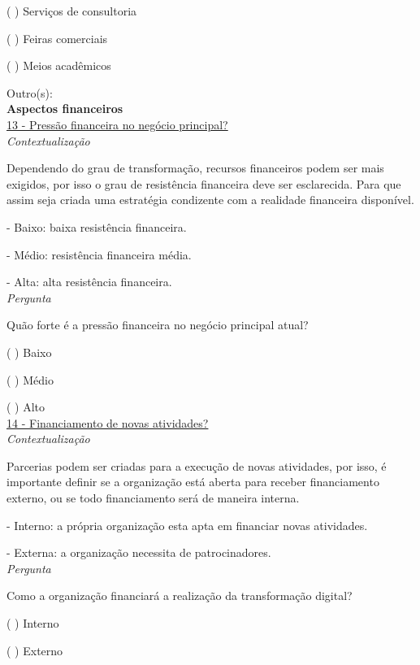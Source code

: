 ( ) Serviços de consultoria

( ) Feiras comerciais

( ) Meios acadêmicos

Outro(s):\\


\textbf{Aspectos financeiros}\\

\underline{13 - Pressão financeira no negócio principal?}\\

\textit{Contextualização}

Dependendo do grau de transformação, recursos financeiros podem ser mais exigidos, por isso o grau de resistência financeira deve ser esclarecida. Para que assim seja criada uma estratégia condizente com a realidade financeira disponível.

- Baixo: baixa resistência financeira.

- Médio: resistência financeira média.

- Alta: alta resistência financeira.\\


\textit{Pergunta}

Quão forte é a pressão financeira no negócio principal atual?

( ) Baixo

( ) Médio

( ) Alto\\


\underline{14 - Financiamento de novas atividades?}\\

\textit{Contextualização}

Parcerias podem ser criadas para a execução de novas atividades, por isso, é importante definir se a organização está aberta para receber financiamento externo, ou se todo financiamento será de maneira interna.

- Interno: a própria organização esta apta em financiar novas atividades.

- Externa: a organização necessita de patrocinadores.\\


\textit{Pergunta}

Como a organização financiará a realização da transformação digital?

( ) Interno

( ) Externo